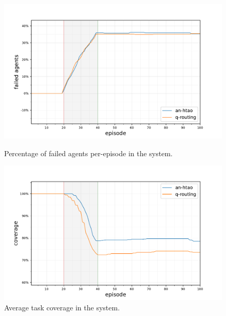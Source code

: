 \begin{figure}[ht]
	\begin{minipage}{.49\textwidth}
		\centering
		\includegraphics[width=1.0\linewidth,trim={25pt 0pt 50pt 0pt},clip]{7balanced_coverage-failed-agents}
		\captionsetup{labelfont=bf,singlelinecheck=on}
		\caption{Percentage of failed agents per-episode \newline in the \simulationNodeFailure{}{} system.}
		\label{fig:node_failure_failed_agents}
	\end{minipage}
	\begin{minipage}{.49\textwidth}
		\centering
		\includegraphics[width=1.0\linewidth,trim={25pt 0pt 50pt 0pt},clip]{7balanced_coverage-coverage}
		\captionsetup{labelfont=bf,singlelinecheck=on}
		\caption{Average task coverage in the \simulationNodeFailure{}{} \newline system.}
		\label{fig:node_failure_coverage}
	\end{minipage}\hfill%
\end{figure}

